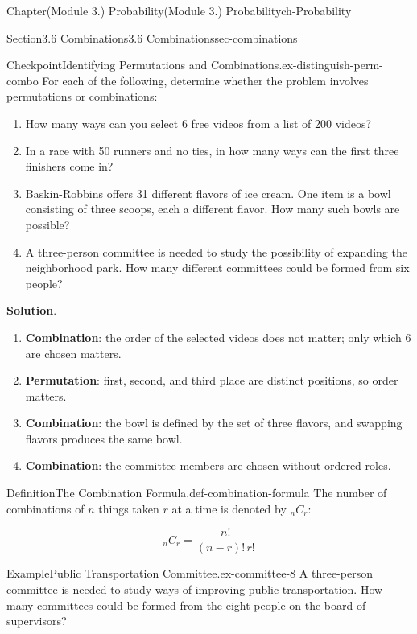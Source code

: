 \documentclass[oneside,10pt,]{book}
\newcommand{\blocktitlefont}{\relax}
\newcommand{\terminology}[1]{\textbf{#1}}
\begin{document}
\begin{chapterptx}{Chapter}{(Module 3.) Probability}{}{(Module 3.) Probability}{}{}{ch-Probability}
\begin{sectionptx}{Section}{3.6 Combinations}{}{3.6 Combinations}{}{}{sec-combinations}
\begin{inlineexercise}{Checkpoint}{Identifying Permutations and Combinations.}{ex-distinguish-perm-combo}
For each of the following, determine whether the problem involves permutations or combinations:%
%
\begin{enumerate}
\item{}How many ways can you select 6 free videos from a list of 200 videos?%
\item{}In a race with 50 runners and no ties, in how many ways can the first three finishers come in?%
\item{}Baskin-Robbins offers 31 different flavors of ice cream. One item is a bowl consisting of three scoops, each a different flavor. How many such bowls are possible?%
\item{}A three-person committee is needed to study the possibility of expanding the neighborhood park. How many different committees could be formed from six people?%
\end{enumerate}
\par\smallskip%
\noindent\textbf{\blocktitlefont Solution}.\hypertarget{ex-distinguish-perm-combo-3}{}\quad{}%
\begin{enumerate}
\item{}\terminology{Combination}: the order of the selected videos does not matter; only which 6 are chosen matters.%
\item{}\terminology{Permutation}: first, second, and third place are distinct positions, so order matters.%
\item{}\terminology{Combination}: the bowl is defined by the set of three flavors, and swapping flavors produces the same bowl.%
\item{}\terminology{Combination}: the committee members are chosen without ordered roles.%
\end{enumerate}
%
\end{inlineexercise}%
\begin{definition}{Definition}{The Combination Formula.}{def-combination-formula}%
The number of combinations of \(n\) things taken \(r\) at a time is denoted by \({}_n C_r\):%
\par
%
\begin{equation*}
{}_n C_r = \frac{n!}{(n-r)! \, r!}
\end{equation*}
%
\end{definition}
\begin{example}{Example}{Public Transportation Committee.}{ex-committee-8}%
A three-person committee is needed to study ways of improving public transportation. How many committees could be formed from the eight people on the board of supervisors?%
\par\smallskip%

\end{example}
\end{sectionptx}
\end{chapterptx}
\end{document}
